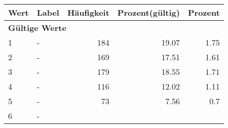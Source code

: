      \begin{longtable}{lXrrr}
     \toprule
     \textbf{Wert} & \textbf{Label} & \textbf{Häufigkeit} & \textbf{Prozent(gültig)} & \textbf{Prozent} \\
     \endhead
     \midrule
     \multicolumn{5}{l}{\textbf{Gültige Werte}}\\

     1 &
     \multicolumn{1}{X}{ -  } &


       \num{184} &
       \num[round-mode=places,round-precision=2]{19,07} &
         \num[round-mode=places,round-precision=2]{1,75} \\

     2 &
     \multicolumn{1}{X}{ -  } &


       \num{169} &
       \num[round-mode=places,round-precision=2]{17,51} &
         \num[round-mode=places,round-precision=2]{1,61} \\

     3 &
     \multicolumn{1}{X}{ -  } &


       \num{179} &
       \num[round-mode=places,round-precision=2]{18,55} &
         \num[round-mode=places,round-precision=2]{1,71} \\

     4 &
     \multicolumn{1}{X}{ -  } &


       \num{116} &
       \num[round-mode=places,round-precision=2]{12,02} &
         \num[round-mode=places,round-precision=2]{1,11} \\

     5 &
     \multicolumn{1}{X}{ -  } &


       \num{73} &
       \num[round-mode=places,round-precision=2]{7,56} &
         \num[round-mode=places,round-precision=2]{0,7} \\

     6 &
     \multicolumn{1}{X}{ -  } &



\end{longtable}
